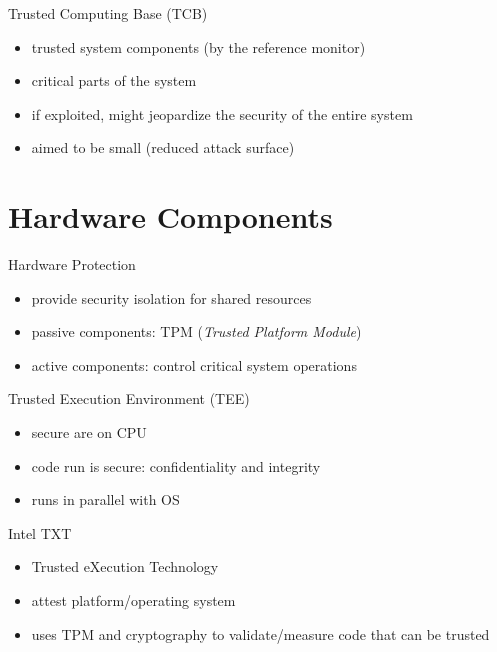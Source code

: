 \documentclass{curs}
\begin{document}
\begin{frame}{Trusted Computing Base (TCB)}
  \begin{itemize}
    \item trusted system components (by the reference monitor)
    \item critical parts of the system
    \item if exploited, might jeopardize the security of the entire system
    \item aimed to be small (reduced attack surface)
  \end{itemize}
\end{frame}

\section{Hardware Components}

\begin{frame}{Hardware Protection}
  \begin{itemize}
    \item provide security isolation for shared resources
    \item passive components: TPM (\textit{Trusted Platform Module})
    \item active components: control critical system operations
  \end{itemize}
\end{frame}

\begin{frame}{Trusted Execution Environment (TEE)}
  \begin{itemize}
    \item secure are on CPU
    \item code run is secure: confidentiality and integrity
    \item runs in parallel with OS
  \end{itemize}
\end{frame}

\begin{frame}{Intel TXT}
  \begin{itemize}
    \item Trusted eXecution Technology
    \item attest platform/operating system
    \item uses TPM and cryptography to validate/measure code that can be trusted
  \end{itemize}
\end{frame}
\end{document}
